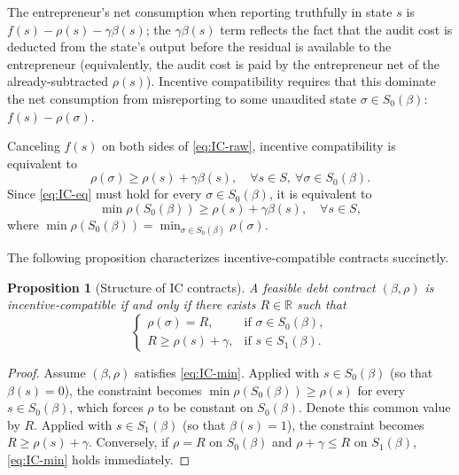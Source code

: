 \documentclass[11pt,a4paper,oneside]{book}
\def\R{\mathbb{R}}
\def\leq{\leqslant}
\def\geq{\geqslant}
\theoremstyle{plain}
\newtheorem{proposition}[theorem]{Proposition}
\theoremstyle{definition}
\theoremstyle{remark}
\numberwithin{equation}{chapter}
\begin{document}
The entrepreneur's net consumption when reporting truthfully in state $s$ is $f(s) - \rho(s) - \gamma \beta(s)$; the $\gamma \beta(s)$ term reflects the fact that the audit cost is deducted from the state's output before the residual is available to the entrepreneur (equivalently, the audit cost is paid by the entrepreneur net of the already-subtracted $\rho(s)$).
Incentive compatibility requires that this dominate the net consumption from misreporting to some unaudited state $\sigma \in S_0(\beta)$: $f(s) - \rho(\sigma)$.

Canceling $f(s)$ on both sides of \eqref{eq:IC-raw}, incentive compatibility is equivalent to
\begin{equation}\label{eq:IC-eq}
  \rho(\sigma) \geq \rho(s) + \gamma \beta(s),
  \quad \forall s \in S, \ \forall \sigma \in S_0(\beta).
\end{equation}
Since \eqref{eq:IC-eq} must hold for every $\sigma \in S_0(\beta)$, it is equivalent to
\begin{equation}\label{eq:IC-min}
  \min \rho(S_0(\beta)) \geq \rho(s) + \gamma \beta(s), \quad \forall s \in S,
  \tag{IC}
\end{equation}
where $\min \rho(S_0(\beta)) = \min_{\sigma \in S_0(\beta)} \rho(\sigma)$.

The following proposition characterizes incentive-compatible contracts succinctly.

\begin{proposition}[Structure of IC contracts]\label{prop:IC-structure}
A feasible debt contract $(\beta, \rho)$ is incentive-compatible if and only if there exists $R \in \R$ such that
\begin{equation*}
  \begin{cases}
    \rho(\sigma) = R, & \text{if } \sigma \in S_0(\beta), \\
    R \geq \rho(s) + \gamma, & \text{if } s \in S_1(\beta).
  \end{cases}
\end{equation*}
\end{proposition}

\begin{proof}
Assume $(\beta, \rho)$ satisfies \eqref{eq:IC-min}.
Applied with $s \in S_0(\beta)$ (so that $\beta(s) = 0$), the constraint becomes $\min \rho(S_0(\beta)) \geq \rho(s)$ for every $s \in S_0(\beta)$, which forces $\rho$ to be constant on $S_0(\beta)$.
Denote this common value by $R$.
Applied with $s \in S_1(\beta)$ (so that $\beta(s) = 1$), the constraint becomes $R \geq \rho(s) + \gamma$.
Conversely, if $\rho = R$ on $S_0(\beta)$ and $\rho + \gamma \leq R$ on $S_1(\beta)$, \eqref{eq:IC-min} holds immediately.
\end{proof}
\end{document}
